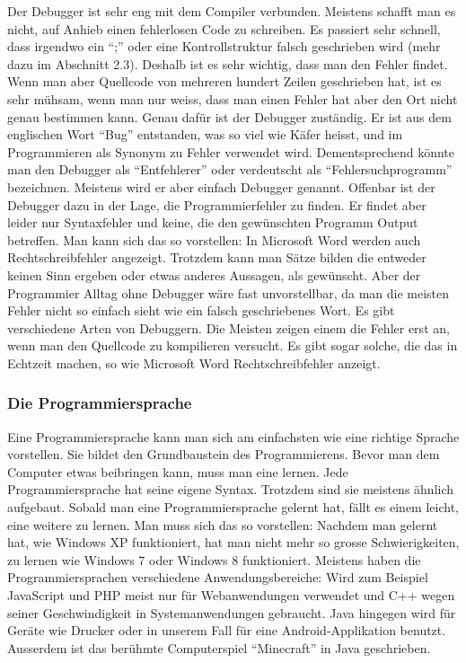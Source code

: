 Der Debugger ist sehr eng mit dem Compiler verbunden. Meistens schafft man es nicht, auf Anhieb einen fehlerlosen Code zu schreiben. Es passiert sehr schnell, dass irgendwo ein "`;"' oder eine Kontrollstruktur falsch geschrieben wird (mehr dazu im Abschnitt 2.3). Deshalb ist es sehr wichtig, dass man den Fehler findet. Wenn man aber Quellcode von mehreren hundert Zeilen geschrieben hat, ist es sehr mühsam, wenn man nur weiss, dass man einen Fehler hat aber den Ort nicht genau bestimmen kann. Genau dafür ist der Debugger zuständig. Er ist aus dem englischen Wort "`Bug"' entstanden, was so viel wie Käfer heisst, und im Programmieren als Synonym zu Fehler verwendet wird. Dementsprechend könnte man den Debugger als "`Entfehlerer"' oder verdeutscht als "`Fehlersuchprogramm"' bezeichnen. Meistens wird er aber einfach Debugger genannt. Offenbar ist der Debugger dazu in der Lage, die Programmierfehler zu finden. Er findet aber leider nur Syntaxfehler und keine, die den gewünschten Programm Output betreffen. Man kann sich das so vorstellen: In Microsoft Word werden auch Rechtschreibfehler angezeigt. Trotzdem kann man Sätze bilden die entweder keinen Sinn ergeben oder etwas anderes Aussagen, als gewünscht. Aber der Programmier Alltag ohne Debugger wäre fast unvorstellbar, da man die meisten Fehler nicht so einfach sieht wie ein falsch geschriebenes Wort. Es gibt verschiedene Arten von Debuggern. Die Meisten zeigen einem die Fehler erst an, wenn man den Quellcode zu kompilieren versucht. Es gibt sogar solche, die das in Echtzeit machen, so wie Microsoft Word Rechtschreibfehler anzeigt.







\subsubsection{Die Programmiersprache}


Eine Programmiersprache kann man sich am einfachsten wie eine richtige Sprache vorstellen. Sie bildet den Grundbaustein des Programmierens. Bevor man dem Computer etwas  beibringen kann, muss man eine lernen. Jede Programmiersprache hat seine eigene Syntax. Trotzdem sind sie meistens ähnlich aufgebaut. Sobald man eine Programmiersprache gelernt hat, fällt es einem leicht, eine weitere zu lernen. Man muss sich das so vorstellen: Nachdem man gelernt hat, wie Windows XP funktioniert, hat man nicht mehr so grosse Schwierigkeiten, zu lernen wie Windows 7 oder Windows 8 funktioniert. Meistens haben die Programmiersprachen verschiedene Anwendungsbereiche: Wird zum Beispiel JavaScript und PHP meist nur für Webanwendungen verwendet und C++ wegen seiner Geschwindigkeit in Systemanwendungen gebraucht. Java hingegen wird für Geräte wie Drucker oder in unserem Fall für eine Android-Applikation benutzt. Ausserdem ist das berühmte Computerspiel "`Minecraft"' in Java geschrieben.


